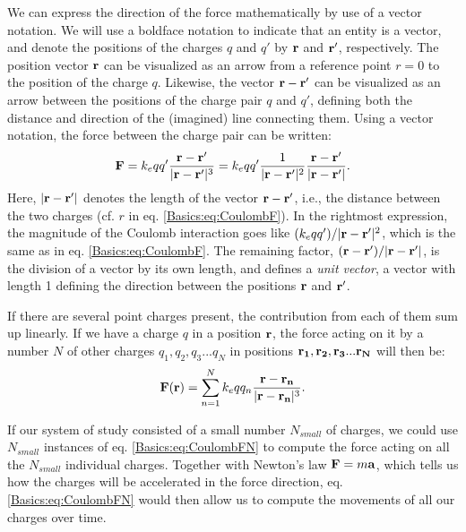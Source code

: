 We can express the direction of the force mathematically by use of a vector notation. We will use a boldface notation to indicate that an entity is a vector, and denote the positions of the charges $q$ and $q'$ by ${\bf r}$ and ${\bf r'}$, respectively. The position vector ${\bf r}$ can be visualized as an arrow from a reference point $r=0$ to the position of the charge $q$. Likewise, the vector ${\bf r}-{\bf r'}$ can be visualized as an arrow between the positions of the charge pair $q$ and $q'$, defining both the distance and direction of the (imagined) line connecting them. Using a vector notation, the force between the charge pair can be written:
\begin{equation}
{\bf F} = k_e q q' \frac{{\bf r}-{\bf r'}}{|{\bf r}-{\bf r'}|^3} = k_e  qq'  \frac{1}{|{\bf r}-{\bf r'}|^2} \frac{{\bf r}-{\bf r'}}{|{\bf r}-{\bf r'}|}.
\label{Basics:eq:CoulombFvec}
\end{equation}
Here, $|{\bf r}-{\bf r'}|$ denotes the length of the vector ${\bf r}-{\bf r'}$, i.e., the distance between the two charges (cf. $r$ in eq. \ref{Basics:eq:CoulombF}). In the rightmost expression, the magnitude of the Coulomb interaction goes like $(k_e qq')/|{\bf r}-{\bf r'}|^2$, which is the same as in eq. \ref{Basics:eq:CoulombF}. The remaining factor, $({\bf r}-{\bf r'})/|{\bf r}-{\bf r'}|$, is the division of a vector by its own length, and defines a \textit{unit vector}, a vector with length 1 defining the direction between the positions ${\bf r}$ and ${\bf r'}$. 

If there are several point charges present, the contribution from each of them sum up linearly. If we have a charge $q$ in a position ${\bf r}$, the force acting on it by a number $N$ of other charges $q_1, q_2, q_3 ... q_N$ in positions ${\bf r_1}, {\bf r_2}, {\bf r_3} ... {\bf r_N}$ will then be:
\begin{equation}
{\bf F}({\bf r}) = \sum_{n=1}^N k_e q q_n \frac{{\bf r}-{\bf r_n}}{|{\bf r}-{\bf r_n}|^3}.
\label{Basics:eq:CoulombFN}
\end{equation}

If our system of study consisted of a small number $N_{small}$ of charges, we could use $N_{small}$ instances of eq. \ref{Basics:eq:CoulombFN} to compute the force acting on all the $N_{small}$ individual charges. Together with Newton's law ${\bf F} = m {\bf a}$, which tells us how the charges will be accelerated in the force direction, eq.\ref{Basics:eq:CoulombFN} would then allow us to compute the movements of all our charges over time. 

